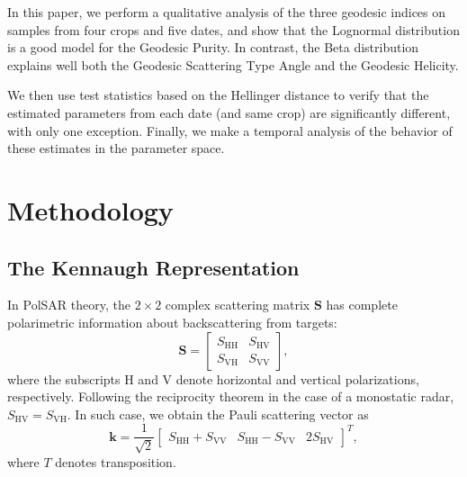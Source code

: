 \documentclass[journal]{IEEEtran}
\begin{document}
	
	In this paper, we perform a qualitative analysis of the three geodesic indices on samples from four crops and five dates, and show that the Lognormal distribution is a good model for the Geodesic Purity. 
	In contrast, the Beta distribution explains well both the Geodesic Scattering Type Angle and the Geodesic Helicity.%
	
	We then use test statistics based on the Hellinger distance to verify that the estimated parameters from each date (and same crop) are significantly different, with only one exception.
	Finally, we make a temporal analysis of the behavior of these estimates in the parameter space.
	
	\section{Methodology}
	
	\subsection{The Kennaugh Representation}
	
	In PolSAR theory, the $2 \times 2$ complex scattering matrix $\bm S$ has
	complete polarimetric information about backscattering
	from targets:
	$$
	\bm S = \begin{bmatrix}
	S_{\text{HH}} &S_{\text{HV}}\\
	S_{\text{VH}} &S_{\text{VV}}
	\end{bmatrix},
	$$
	where the subscripts $\text{H}$ and $\text{V}$ denote horizontal and vertical
	polarizations, respectively. 
	Following the reciprocity theorem
	in the case of a monostatic radar, 
	$S_{\text{HV}}=S_{\text{VH}}$.
	In such case, we obtain the Pauli scattering vector as
	$$
	\bm k = \frac1{\sqrt{2}}
	\begin{bmatrix}
	S_{\text{HH}} + S_{\text{VV}} 
	& S_{\text{HH}} - S_{\text{VV}} 
	& 2S_{\text{HV}}
	\end{bmatrix}^T,
	$$
	where $T$ denotes transposition.
	
\end{document}
